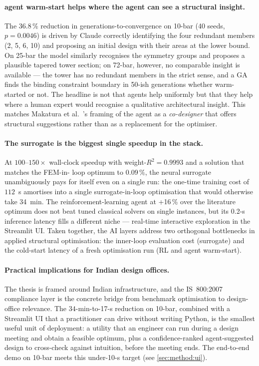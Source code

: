 \paragraph{agent warm-start helps where the agent can see a
structural insight.} The \num{36.8}\,\% reduction in
generations-to-convergence on 10-bar (\num{40} seeds,
$p = \num{0.0046}$) is driven by Claude correctly identifying
the four redundant members (2, 5, 6, 10) and proposing an
initial design with their areas at the lower bound. On 25-bar
the model similarly recognises the symmetry groups and proposes
a plausible tapered tower section; on 72-bar, however, no
comparable insight is available --- the tower has no redundant
members in the strict sense, and a GA finds the binding
constraint boundary in \num{50}-ish generations whether warm-
started or not. The headline is not that agents help uniformly but
that they help where a human expert would recognise a
qualitative architectural insight. This matches Makatura et
al.~\cite{makatura2024}'s framing of the agent as a
\emph{co-designer} that offers structural suggestions rather
than as a replacement for the optimiser.

\paragraph{The surrogate is the biggest single speedup in the
stack.} At $\num{100}$--$\num{150}\times$ wall-clock speedup with
weight-$R^2=\num{0.9993}$ and a solution that matches the FEM-in-
loop optimum to $\num{0.09}\,\%$, the neural surrogate
unambiguously pays for itself even on a single run: the
one-time training cost of $\num{112}$~s amortises into a single
surrogate-in-loop optimisation that would otherwise take
\num{34}~min. The reinforcement-learning agent at +\num{16}\,\%
over the literature optimum does not beat tuned classical
solvers on single instances, but its \num{0.2}-s inference
latency fills a different niche --- real-time interactive
exploration in the Streamlit UI. Taken together, the AI layers
address two orthogonal bottlenecks in applied structural
optimisation: the inner-loop evaluation cost (surrogate) and the
cold-start latency of a fresh optimisation run (RL and agent
warm-start).

\paragraph{Practical implications for Indian design offices.}
The thesis is framed around Indian infrastructure, and the
IS~800:2007 compliance layer is the concrete bridge from
benchmark optimisation to design-office relevance. The
$\num{34}$-min-to-\num{17}-s reduction on 10-bar, combined with
a Streamlit UI that a practitioner can drive without writing
Python, is the smallest useful unit of deployment: a utility
that an engineer can run during a design meeting and obtain a
feasible optimum, plus a confidence-ranked agent-suggested design
to cross-check against intuition, before the meeting ends. The
end-to-end demo on 10-bar meets this under-\num{10}-s target
(see \cref{sec:method:ui}).

